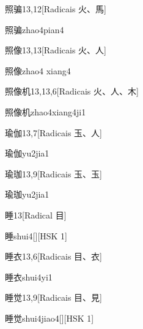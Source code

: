 \begin{entry}{照骗}{13,12}[Radicais ⽕、⾺]
  \begin{phonetics}{照骗}{zhao4pian4}
  \end{phonetics}
\end{entry}

\begin{entry}{照像}{13,13}[Radicais ⽕、⼈]
  \begin{phonetics}{照像}{zhao4 xiang4}
  \end{phonetics}
\end{entry}

\begin{entry}{照像机}{13,13,6}[Radicais ⽕、⼈、⽊]
  \begin{phonetics}{照像机}{zhao4xiang4ji1}
  \end{phonetics}
\end{entry}

\begin{entry}{瑜伽}{13,7}[Radicais ⽟、⼈]
  \begin{phonetics}{瑜伽}{yu2jia1}
  \end{phonetics}
\end{entry}

\begin{entry}{瑜珈}{13,9}[Radicais ⽟、⽟]
  \begin{phonetics}{瑜珈}{yu2jia1}
  \end{phonetics}
\end{entry}

\begin{entry}{睡}{13}[Radical ⽬]
  \begin{phonetics}{睡}{shui4}[][HSK 1]
  \end{phonetics}
\end{entry}

\begin{entry}{睡衣}{13,6}[Radicais ⽬、⾐]
  \begin{phonetics}{睡衣}{shui4yi1}
  \end{phonetics}
\end{entry}

\begin{entry}{睡觉}{13,9}[Radicais ⽬、⾒]
  \begin{phonetics}{睡觉}{shui4jiao4}[][HSK 1]
  \end{phonetics}
\end{entry}

